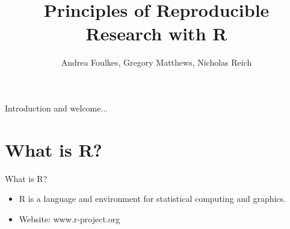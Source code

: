 

\title{Principles of Reproducible Research with R}
\newcommand{\ModuleShortname}{shortName}
\author{Andrea Foulkes, Gregory Matthews, Nicholas Reich}
\newcommand{\LicenseText}{Made available under the Creative Commons Attribution-ShareAlike 3.0 Unported License: http://creativecommons.org/licenses/by-sa/3.0/deed.en\textunderscore US }
\newcommand{\Instructor}{}
\newcommand{\Course}{Biostatistics in Practice: Research Training in High-Performance Computing with R}






\begin{frame}[plain]
	\titlepage
\end{frame}





\begin{frame}{Introduction and welcome...}

\end{frame}

\section{What is R?}
\begin{frame}
What is R?
\begin{itemize}
\item R is a language and environment for statistical computing and graphics. 
\item Website: www.r-project.org
\end{itemize}
\end{frame}

